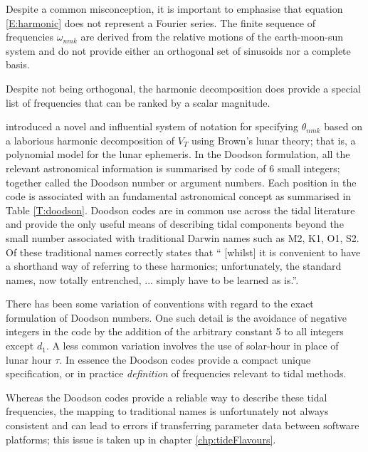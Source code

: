 Despite a common misconception, it is important to emphasise that equation \ref{E:harmonic} does not represent a Fourier series.  The finite sequence of frequencies $\omega_{nmk}$ are derived from the relative motions of the earth-moon-sun system and do not provide either an orthogonal set of sinusoids nor a complete basis.

Despite not being orthogonal, the harmonic decomposition does provide a special list of frequencies that can be ranked by a scalar magnitude. 

\citet{Doodson:1921kt} introduced a novel and influential system of notation for specifying $\theta_{nmk}$ based on a laborious harmonic decomposition of $V_T$ using Brown's lunar theory; that is, a polynomial model for the lunar ephemeris.  
In the Doodson formulation, all the relevant astronomical information is summarised by code of 6 small integers; together called the Doodson number or argument numbers.   Each position in the code is associated with an fundamental astronomical concept as summarised in Table \ref{T:doodson}.  Doodson codes are in common use across the tidal literature and provide the only useful means of describing tidal components beyond the small number associated with traditional Darwin names such as M2, K1, O1, S2.
Of these traditional names \citet{10.1016/b978-0-444-53802-4.00058-0} correctly states that `` [whilst] it is convenient to have a shorthand way of referring to these harmonics; unfortunately, the standard names,  now totally entrenched, ... simply have to be learned as is.''.

There has been some variation of conventions with regard to the exact formulation of Doodson numbers.  One such detail is the avoidance of negative integers in the code by the addition of the arbitrary constant 5 to all integers except $d_1$.   A less common variation involves the use of solar-hour in place of lunar hour $\tau$.  
In essence the Doodson codes provide a compact unique specification, or in practice \emph{definition} of frequencies relevant to tidal methods.

Whereas the Doodson codes provide a reliable way to describe these tidal frequencies, the mapping to traditional names is unfortunately not always consistent and can lead to errors if transferring parameter data between software platforms; this issue is taken up in chapter \ref{chp:tideFlavours}.



